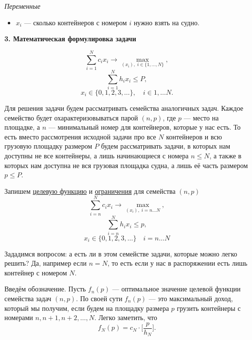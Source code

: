 \bigskip

\textit{Переменные}
\begin{itemize}[nosep]
	\item $x_i$ --- сколько контейнеров с номером $i$ нужно взять на судно.
\end{itemize}

\begin{figure}[H]
	\centering
	\def\svgwidth{\linewidth}
	\fbox{}
\end{figure}

\bigskip

\textbf{3. Математическая формулировка задачи}

\[
\sum_{i=1}^{N} c_i x_i \to \max_{(x_i), \; i \in \{1, \dots, N\}},
\]
\[
\sum_{i=1}^{N} h_i x_i \le P,
\]
\[
x_i \in \{0, 1, 2, 3, \dots\}, \quad i \in {1, \dots N}.
\]

\solution

Для решения задачи будем рассматривать семейства аналогичных задач. Каждое семейство будет охарактеризовываться парой $(n, p)$, где $p$ --- место на площадке, а $n$ --- минимальный номер для контейнеров, которые у нас есть. То есть вместо рассмотрения исходной задачи про все $N$ контейнеров и всю грузовую площадку размером $P$ будем рассматривать задачи, в которых нам доступны не все контейнеры, а лишь начинающиеся с номера $n \le N$, а также в которых нам доступна не вся грузовая площадка судна, а лишь её часть размером $p \le P$.

\begin{figure}[H]
	\centering
	\def\svgwidth{\linewidth}
	\fbox{}
\end{figure}

Запишем \underline{целевую функцию} и \underline{ограничения} для семейства $(n, p)$
\[
\sum_{i=n}^{N} c_i x_i \to \max_{(x_i), \; i=n \dots N},
\]
\[
\sum_{i=n}^{N} h_i x_i \le p,
\]
\[
x_i \in \{0, 1, 2, 3, \dots\} \quad i = n \dots N
\]

Зададимся вопросом: а есть ли в этом семействе задачи, которые можно легко решить? Да, например если $n = N$, то есть если у нас в распоряжении есть лишь контейнер с номером $N$.

Введём обозначение. Пусть $f_n(p)$ --- оптимальное значение целевой функции семейства задач $(n, p)$. По своей сути $f_n(p)$ --- это максимальный доход, который мы получим, если будем на площадку размера $p$ грузить контейнеры с номерами $n, n+1, n+2, \dots, N$. Легко заметить, что
\[
f_N(p) = c_N \cdot \bigg[\frac{p}{h_N}\bigg].
\]

